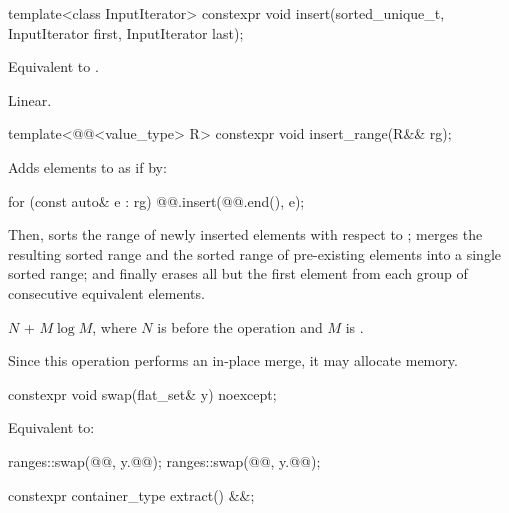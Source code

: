 %
\begin{itemdecl}
template<class InputIterator>
  constexpr void insert(sorted_unique_t, InputIterator first, InputIterator last);
\end{itemdecl}

\begin{itemdescr}
\pnum
\effects
Equivalent to .

\pnum
\complexity
Linear.
\end{itemdescr}

%
\begin{itemdecl}
template<@@<value_type> R>
  constexpr void insert_range(R&& rg);
\end{itemdecl}

\begin{itemdescr}
\pnum
\effects
Adds elements to  as if by:
\begin{codeblock}
for (const auto& e : rg) {
  @@.insert(@@.end(), e);
}
\end{codeblock}
Then,
sorts the range of newly inserted elements with respect to ;
merges the resulting sorted range and
the sorted range of pre-existing elements into a single sorted range; and
finally erases all but the first element
from each group of consecutive equivalent elements.

\pnum
\complexity
$N$ + $M \log M$, where $N$ is  before the operation and $M$
is .

\pnum
\remarks
Since this operation performs an in-place merge, it may allocate memory.
\end{itemdescr}

%
\begin{itemdecl}
constexpr void swap(flat_set& y) noexcept;
\end{itemdecl}

\begin{itemdescr}
\pnum
\effects
Equivalent to:
\begin{codeblock}
ranges::swap(@@, y.@@);
ranges::swap(@@, y.@@);
\end{codeblock}
\end{itemdescr}

%
\begin{itemdecl}
constexpr container_type extract() &&;
\end{itemdecl}

